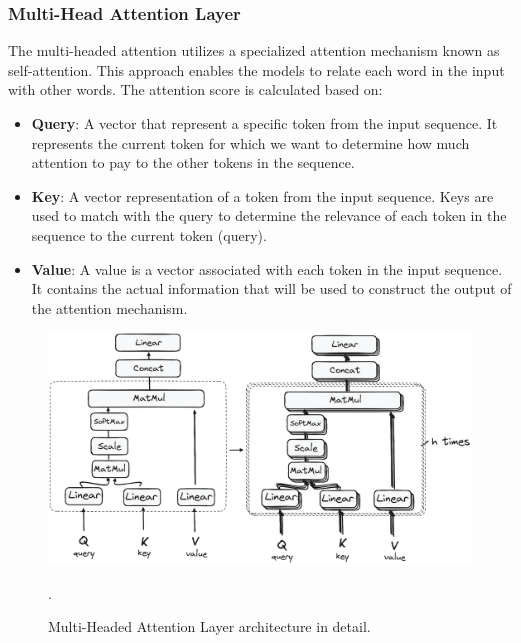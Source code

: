 \documentclass[12pt]{article}
\begin{document}
\subsubsection{Multi-Head Attention Layer}
\label{subsubsec:transformer_encoder_multi_head} 
The multi-headed attention utilizes a specialized attention mechanism 
known as self-attention. This approach enables the models to relate each word in the input with other words.
The attention score is calculated based on:
\begin{itemize}
    \item \textbf{Query}: A vector that represent a specific token from the input sequence. It represents the current token for which 
    we want to determine how much attention to pay to the other tokens in the sequence.
    \item \textbf{Key}: A vector representation of a token from the input sequence. Keys are used to match with the query to determine 
    the relevance of each token in the sequence to the current token (query).
    \item \textbf{Value}: A value is a vector associated with each token in the input sequence.
    It contains the actual information that will be used to construct the output of the attention mechanism.
\end{itemize}

\begin{figure}
    \centering
    \includegraphics[width=.7\textwidth]{Images/transformer_multi_headed_attention_layer.png}
    \caption{Multi-Headed Attention Layer architecture in detail.}.
    \label{fig:transformer_multi_headed_attention_layer}
\end{figure}
\end{document}
